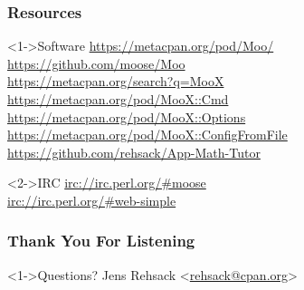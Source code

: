 \documentclass[ngerman,xcolor={table,dvipsnames},scriptsizeer,compress,hyperref={bookmarks,colorlinks}]{beamer}
\begin{document}
\begin{frame}[t,fragile]
\frametitle{Resources}
\begin{block}<1->{Software}
\url{https://metacpan.org/pod/Moo/} \\
\url{https://github.com/moose/Moo} \\
\url{https://metacpan.org/search?q=MooX} \\
\url{https://metacpan.org/pod/MooX::Cmd} \\
\url{https://metacpan.org/pod/MooX::Options} \\
\url{https://metacpan.org/pod/MooX::ConfigFromFile} \\
\url{https://github.com/rehsack/App-Math-Tutor}
\end{block}

\begin{block}<2->{IRC}
\url{irc://irc.perl.org/#moose} \\
\url{irc://irc.perl.org/#web-simple}
\end{block}
\end{frame}

\begin{frame}[fragile]
\frametitle{Thank You For Listening}
\begin{block}<1->{Questions?}
Jens Rehsack \textless{}\href{mailto:rehsack@cpan.org}{rehsack@cpan.org}\textgreater{}
\end{block}
\end{frame}
\end{document}
